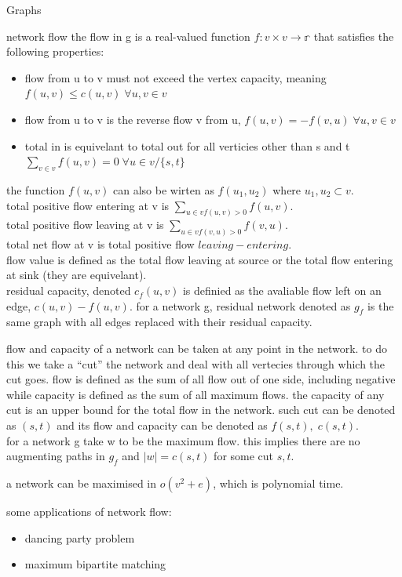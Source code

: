 \documentclass[12pt, letterpaper]{article}
\begin{document}
\begin{section}{Graphs}
\begin{subsection}{network flow}
    the flow in g is a real-valued function \(f: v \times v \to \mathbb{r}\)
    that satisfies the following properties:
    \begin{itemize}
      \item flow from u to v must not exceed the vertex capacity, meaning
            \(f(u, v) \leq c(u, v) \; \forall u, v \in v\)
      \item flow from u to v is the reverse flow v from u,
            \(f(u, v) = -f(v, u) \; \forall u, v \in v\)
      \item total in is equivelant to total out for all verticies other than s and t
            \(\sum_{v \in v} f(u, v) = 0 \; \forall u \in v/\{{} s, t \}{}\)
    \end{itemize}
    the function \(f(u, v)\) can also be wirten as \(f(u_{1}, u_{2})\) where
    \(u_{1}, u_{2} \subset v\). \\
    total positive flow entering at v is \(\sum_{u \in v f(u, v) > 0} f(u, v)\). \\
    total positive flow leaving at v is \(\sum_{u \in v f(v, u) > 0} f(v, u)\). \\
    total net flow at v is total positive flow \(leaving - entering\). \\
    flow value is defined as the total flow leaving at source or the total
    flow entering at sink (they are equivelant). \\
    residual capacity, denoted \(c_{f}(u, v)\) is definied as the avaliable flow
    left on an edge, \(c(u, v) - f(u, v)\). for a network g, residual network denoted as \(g_{f}\)
    is the same graph with all edges replaced with their residual capacity.

    flow and capacity of a network can be taken at any point in the network.
    to do this we take a ``cut'' the network and deal with all vertecies through
    which the cut goes. flow is defined as the sum of all flow out of one side, including
    negative while capacity is defined as the sum of all maximum flows. the capacity of any
    cut is an upper bound for the total flow in the network. such cut can be denoted
    as \((s, t)\) and its flow and capacity can be denoted as \(f(s, t), \; c(s, t)\). \\
    for a network g take w to be the maximum flow. this implies there are no
    augmenting paths in \(g_{f}\) and \(|w| = c(s, t)\) for some cut \(s, t\).

    a network can be maximised in \(o(v^{2} + e)\), which is polynomial time.

    some applications of network flow:
    \begin{itemize}
      \item dancing party problem
      \item maximum bipartite matching
    \end{itemize}

  \end{subsection}

\end{section}
\end{document}
